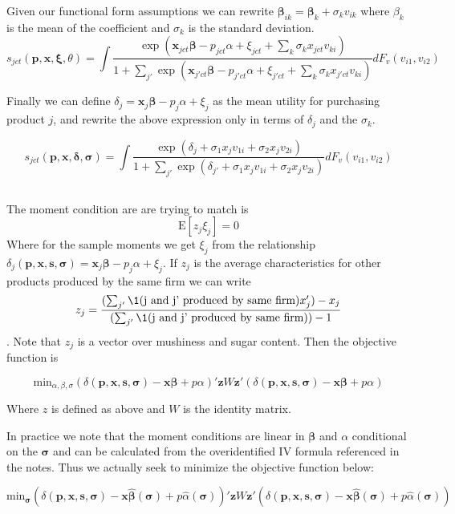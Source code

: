 \documentclass[11pt]{article}
\newcommand{\E}{\mathrm{E}}
\begin{document}
Given our functional form assumptions we can rewrite $\bm \beta_{ik} = \bm \beta_{k} + \sigma_{k} v_{ik}$ where $\beta_k$ is the mean of the coefficient and $\sigma_{k}$ is the standard deviation. 
$$ s_{jct}(\bm p, \bm x, \bm \xi, \theta) = 
\int \frac{\exp (\bm x_{jct} \bm \beta - p_{jct}\alpha + \xi_{jct} + \sum_k \sigma_k x_{jct} v_{ki})}
{1 + \sum_{j'} \exp(\bm x_{j'ct} \bm \beta - p_{j'ct} \alpha + \xi_{j'ct} + \sum_k \sigma_k x_{j'ct} v_{ki})}
dF_v(v_{i1},v_{i2})
$$

Finally we can define $\delta_j = \bm x_{j} \bm \beta - p_j\alpha + \xi_j$ as the mean utility for purchasing product $j$, and rewrite the above expression only in terms of $\delta_j$ and the $\sigma_k$.

$$ s_{jct}(\bm p, \bm x, \bm \delta, \bm \sigma) = 
\int \frac{\exp (\delta_j  + \sigma_1 x_j v_{1i} + \sigma_2 x_j v_{2i})}
{1 + \sum_{j'} \exp(\delta_{j'} + \sigma_1 x_j v_{1i} + \sigma_2 x_j v_{2i})}
dF_v(v_{i1},v_{i2})
$$

\subsection{}
The moment condition are are trying to match is
$$\E [z_j\xi_j]= 0$$
Where for the sample moments we get $\xi_j$ from the relationship $\delta_j(\bm p, \bm x, \bm s, \bm \sigma) = \bm x_j \bm \beta - p_j \alpha + \xi_j$. If $z_j$ is the average characteristics for other products produced by the same firm we can write $$z_{j} =\frac{(\sum_{j'}\1(\text{j and j' produced by same firm})x_j') - x_j}{(\sum_{j'}\1(\text{j and j' produced by same firm}))-1}$$.
Note that $z_j$ is a vector over mushiness and sugar content. Then the objective function is

$$\text{min}_{\alpha, \beta, \sigma}(\delta(\bm p, \bm x, \bm s, \bm \sigma) - \bm x \bm \beta + p\alpha)'\bm z W \bm z'(\delta(\bm p, \bm x, \bm s, \bm \sigma) - \bm x \bm \beta + p\alpha)$$

Where $z$ is defined as above and $W$ is the identity matrix.

In practice we note that the moment conditions are linear in $\bm \beta$ and $\alpha$ conditional on the $\bm \sigma$ and can be calculated from the overidentified IV formula referenced in the notes. Thus we actually seek to minimize the objective function below: 

$$\text{min}_{\bm \sigma}(\delta(\bm p, \bm x, \bm s, \bm \sigma) - \bm x \hat{\bm \beta}(\bm \sigma)+ p\hat{\alpha}(\bm \sigma))'\bm z W \bm z'(\delta(\bm p, \bm x, \bm s, \bm \sigma) - \bm x \hat{\bm \beta}(\bm \sigma)+ p\hat{\alpha}(\bm \sigma))$$
\end{document}

